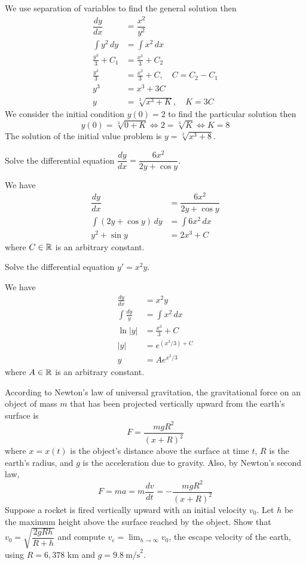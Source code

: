 \begin{solution}
    We use separation of variables to find the general solution then
    \begin{align*}
        \dfrac{dy}{dx} &= \dfrac{x^2}{y^2} \\
        \int y^2\,dy &= \int x^2\,dx \\
        \frac{y^3}{3}+C_1 &= \frac{x^3}{3}+C_2 \\
        \frac{y^3}{3} &=\frac{x^3}{3}+C,\quad C=C_2-C_1 \\
        y^3 &= x^3+3C \\
        y &= \sqrt[3]{x^3+K},\quad K=3C
    \end{align*}
    We consider the initial condition \(y(0)=2\) to find the particular
    solution then
    \[y(0)=\sqrt[3]{0+K}\iff 2=\sqrt[3]{K}\iff K=8\]
    The solution of the initial value problem is \(y=\sqrt[3]{x^3+8}\).
\end{solution}
\begin{problem}
    Solve the differential equation \(\dfrac{dy}{dx}=\dfrac{6x^2}{2y+\cos y}\).
\end{problem}
\begin{solution}
    We have
    \begin{align*}
        \dfrac{dy}{dx} &= \dfrac{6x^2}{2y+\cos y} \\
        \int(2y+\cos y)\,dy &= \int 6x^2\,dx \\
        y^2+\sin y &= 2x^3+C
    \end{align*}
    where \(C\in\mathbb{R}\) is an arbitrary constant.
\end{solution}
\begin{problem}
    Solve the differential equation \(y'=x^2y\).
\end{problem}
\begin{solution}
    We have
    \begin{align*}
        \frac{dy}{dx} &= x^2y \\ \int \frac{dy}{y} &= \int x^2\,dx \\
        \ln |y| &= \frac{x^3}{3}+C \\ |y| &= e^{(x^3/3)+C}\\ y &= Ae^{x^3/3}
    \end{align*}
    where \(A\in\mathbb{R}\) is an arbitrary constant.
\end{solution}
\begin{problem}
    According to Newton's law of universal gravitation,
    the gravitational force on an object of mass \(m\) that has been
    projected vertically upward from the earth's surface is
    \[F=\frac{mgR^2}{(x+R)^2}\]
    where \(x=x(t)\) is the object's distance
    above the surface at time \(t\), \(R\) is the
    earth's radius, and \(g\) is the acceleration due to gravity.
    Also, by Newton's second law,
    \[F=ma=m\frac{dv}{dt}=-\frac{mgR^2}{(x+R)^2}\]
    Suppose a rocket is fired vertically upward with an initial velocity \(v_0\).
    Let \(h\) be the maximum height above the surface reached by the object.
    Show that \(v_0=\sqrt{\dfrac{2gRh}{R+h}}\) and compute
    \(v_e=\lim_{h\to\infty}v_0\), the escape velocity of the earth, using
    \(R=6,378\) km and \(g=9.8\ \text{m/s}^2\).
\end{problem}
